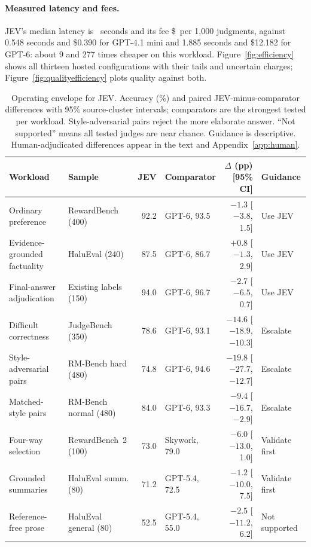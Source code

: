 \documentclass[11pt]{article}
\begin{document}
\paragraph{Measured latency and fees.}
JEV's median latency is \expJevLatency\ seconds and its fee \$\expJevFee\ per 1,000 judgments, against 0.548 seconds and \$0.390 for GPT-4.1 mini and 1.885 seconds and \$12.182 for GPT-6: about 9 and 277 times cheaper on this workload. Figure~\ref{fig:efficiency} shows all thirteen hosted configurations with their tails and uncertain charges; Figure~\ref{fig:qualityefficiency} plots quality against both.

\begin{table}[!t]
\centering\footnotesize\setlength{\tabcolsep}{3pt}
\begin{tabular}{@{}llrlrl@{}}\toprule
Workload & Sample & JEV & Comparator & $\Delta$ (pp) [95\% CI] & Guidance \\\midrule
Ordinary preference & RewardBench (400) & 92.2 & GPT-6, 93.5 & $-1.3$ [$-3.8$, 1.5] & Use JEV \\
Evidence-grounded factuality & HaluEval (240) & 87.5 & GPT-6, 86.7 & $+0.8$ [$-1.3$, 2.9] & Use JEV \\
Final-answer adjudication & Existing labels (150) & 94.0 & GPT-6, 96.7 & $-2.7$ [$-6.5$, 0.7] & Use JEV \\
Difficult correctness & JudgeBench (350) & 78.6 & GPT-6, 93.1 & $-14.6$ [$-18.9$, $-10.3$] & Escalate \\
Style-adversarial pairs & RM-Bench hard (480) & 74.8 & GPT-6, 94.6 & $-19.8$ [$-27.7$, $-12.7$] & Escalate \\
Matched-style pairs & RM-Bench normal (480) & 84.0 & GPT-6, 93.3 & $-9.4$ [$-16.7$, $-2.9$] & Escalate \\
Four-way selection & RewardBench~2 (100) & 73.0 & Skywork, 79.0 & $-6.0$ [$-13.0$, 1.0] & Validate first \\
Grounded summaries & HaluEval summ. (80) & 71.2 & GPT-5.4, 72.5 & $-1.2$ [$-10.0$, 7.5] & Validate first \\
Reference-free prose & HaluEval general (80) & 52.5 & GPT-5.4, 55.0 & $-2.5$ [$-11.2$, 6.2] & Not supported \\
\bottomrule\end{tabular}
\caption{Operating envelope for JEV. Accuracy (\%) and paired JEV-minus-comparator differences with 95\% source-cluster intervals; comparators are the strongest tested per workload. Style-adversarial pairs reject the more elaborate answer. ``Not supported'' means all tested judges are near chance. Guidance is descriptive. Human-adjudicated differences appear in the text and Appendix~\ref{app:human}.}
\label{tab:envelope}
\end{table}
\end{document}
